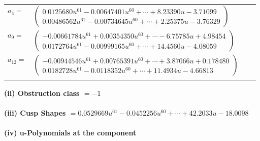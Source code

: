 \documentclass[1p]{elsarticle_modified}
\theoremstyle{definition}
\begin{document}
\begin{tabular}{m{7pt} m{180pt} m{7pt} m{180pt} }
\flushright $a_{4}=$&$\begin{pmatrix}0.0125680 u^{61}-0.00647401 u^{60}+\cdots+8.23390 u-3.71099\\0.00486562 u^{61}-0.00734645 u^{60}+\cdots+2.25375 u-3.76329\end{pmatrix}$ \\
\flushright $a_{9}=$&$\begin{pmatrix}-0.00661784 u^{61}+0.00354350 u^{60}+\cdots-6.75785 u+4.98454\\0.0172764 u^{61}-0.00999165 u^{60}+\cdots+14.4560 u-4.08059\end{pmatrix}$ \\
\flushright $a_{12}=$&$\begin{pmatrix}-0.00944546 u^{61}+0.00765391 u^{60}+\cdots+3.87066 u+0.178480\\0.0182728 u^{61}-0.0118352 u^{60}+\cdots+11.4934 u-4.66813\end{pmatrix}$\\&\end{tabular}
\flushleft \textbf{(ii) Obstruction class $= -1$}\\~\\
\flushleft \textbf{(iii) Cusp Shapes $= 0.0529669 u^{61}-0.0452256 u^{60}+\cdots+42.2033 u-18.0098$}\\~\\
\newpage\renewcommand{\arraystretch}{1}
\flushleft \textbf{(iv) u-Polynomials at the component}\newline \\
\end{document}
